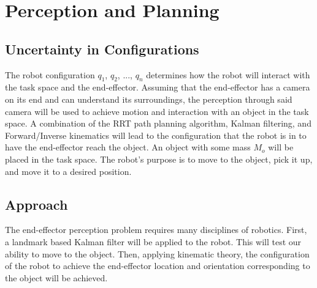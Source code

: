 \section{Perception and Planning}
\subsection{Uncertainty in Configurations}
The robot configuration $q_1$, $q_2$, ..., $q_n$ determines how the robot will
interact with the task space and the end-effector.
Assuming that the end-effector has a camera on its end and can understand its
surroundings, the perception through said camera will be used to achieve motion
and interaction with an object in the task space.
A combination of the RRT path planning algorithm, Kalman filtering, and
Forward/Inverse kinematics will lead to the configuration that the robot is in
to have the end-effector reach the object.
An object with some mass $M_o$ will be placed in the task space.
The robot's purpose is to move to the object, pick it up, and move it to a
desired position.

\subsection{Approach}
The end-effector perception problem requires many disciplines of robotics.
First, a landmark based Kalman filter will be applied to the robot.
This will test our ability to move to the object.
Then, applying kinematic theory, the configuration of the robot to achieve the
end-effector location and orientation corresponding to the object will be
achieved.

